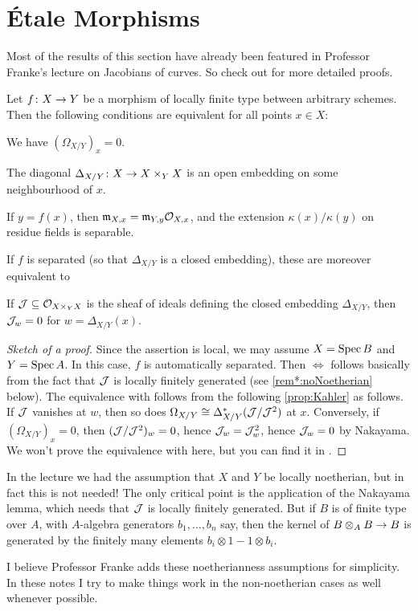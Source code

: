 \documentclass[a4paper, 10pt, oneside, DIV=9, chapterprefix=true, numbers=enddot, bibliography=totoc]{scrbook}
\begin{document}
\section{Étale Morphisms}
Most of the results of this section have already been featured in Professor Franke's lecture on Jacobians of curves. So check out \cite[Section~2.7]{jacobians} for more detailed proofs.
\begin{prop}\label{prop:unramified}
	Let $f\colon X\morphism Y$ be a morphism of locally finite type between arbitrary schemes. Then the following conditions are equivalent for all points $x\in X$:
	\begin{alphanumerate}
		\item We have $(\Omega_{X/Y})_x=0$.
		\item The diagonal $\Delta_{X/Y}\colon X\morphism X\times_YX$ is an open embedding on some neighbourhood of $x$.
		\item If $y=f(x)$, then $\mathfrak{m}_{X,x}=\mathfrak{m}_{Y,y}\mathcal{O}_{X,x}$, and the extension $\kappa(x)/\kappa(y)$ on residue fields is separable.
	\end{alphanumerate}
	If $f$ is separated (so that $\Delta_{X/Y}$ is a closed embedding), these are moreover equivalent to
	\begin{alphanumerate}\setcounter{enumi}{3}
		\item If $\mathcal{J}\subseteq \mathcal{O}_{X\times_YX}$ is the sheaf of ideals defining the closed embedding $\Delta_{X/Y}$, then $\mathcal{J}_w=0$ for $w=\Delta_{X/Y}(x)$.
	\end{alphanumerate}
\end{prop}
\begin{proof}[Sketch of a proof]
	Since the assertion is local, we may assume $X=\operatorname{Spec} B$ and $Y=\operatorname{Spec} A$. In this case, $f$ is automatically separated. Then  $\Leftrightarrow$  follows basically from the fact that $\mathcal{J}$ is locally finitely generated (see \cref{rem*:noNoetherian} below). The equivalence with  follows from the following \cref{prop:Kahler} as follows. If $\mathcal{J}$ vanishes at $w$, then so does $\Omega_{X/Y}\cong \Delta_{X/Y}^*(\mathcal{J}/\mathcal{J}^2)$ at $x$. Conversely, if $(\Omega_{X/Y})_x=0$, then $(\mathcal{J}/\mathcal{J}^2)_w=0$, hence $\mathcal{J}_w=\mathcal{J}_w^2$, hence $\mathcal{J}_w=0$ by Nakayama. We won't prove the equivalence with  here, but you can find it in \cite[Lemma~2.7.2]{jacobians}.
\end{proof}
\begin{rem*}\label{rem*:noNoetherian}
	In the lecture we had the assumption that $X$ and $Y$ be locally noetherian, but in fact this is not needed! The only critical point is the application of the Nakayama lemma, which needs that $\mathcal{J}$ is locally finitely generated. But if $B$ is of finite type over $A$, with $A$-algebra generators $b_1,\dotsc,b_n$ say, then the kernel of $B\otimes_AB\morphism B$ is generated by the finitely many elements $b_i\otimes 1-1\otimes b_i$.
	
	I believe Professor Franke adds these noetherianness assumptions for simplicity. In these notes I try to make things work in the non-noetherian cases as well whenever possible.
\end{rem*}
\end{document}

